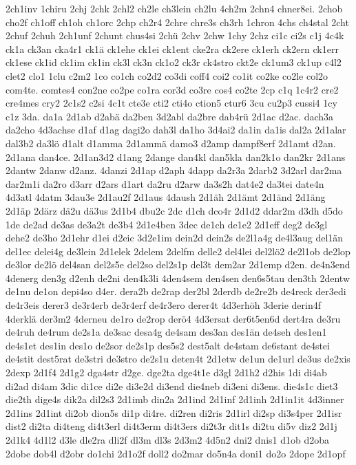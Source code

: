 {2ch1inv
1chiru
2chj
2chk
2chl2
ch2le
ch3lein
ch2lu
4ch2m
2chn4
chner8ei.
2chob
cho2f
ch1off
ch1oh
ch1orc
2chp
ch2r4
2chre
chre3s
ch3rh
1chron
4chs
ch4stal
2cht
2chuf
2chuh
2ch1unf
2chunt
chus4si
2chü
2chv
2chw
1chy
2chz
ci1c
ci2s
c1j
4c4k
ck1a
ck3an
cka4r1
ck1ä
ck1ehe
ck1ei
ck1ent
cke2ra
ck2ere
ck1erh
ck2ern
ck1err
ck1ese
ck1id
ck1im
ck1in
ck3l
ck3n
ck1o2
ck3r
ck4stro
ckt2e
ck1um3
ck1up
c4l2
clet2
clo1
1clu
c2m2
1co
co1ch
co2d2
co3di
coff4
coi2
co1it
co2ke
co2le
col2o
com4te.
comtes4
con2ne
co2pe
co1ra
cor3d
co3re
cos4
co2te
2cp
c1q
1c4r2
cre2
cre4mes
cry2
2c1s2
c2si
4c1t
cte3e
cti2
cti4o
ction5
ctur6
3cu
cu2p3
cussi4
1cy
c1z
3da.
da1a
2d1ab
d2abä
da2ben
3d2abl
da2bre
dab4rü
2d1ac
d2ac.
dach3a
da2cho
4d3achse
d1af
d1ag
dagi2o
dah3l
da1ho
3d4ai2
da1in
da1is
dal2a
2d1alar
dal3b2
da3lö
d1alt
d1amma
2d1ammä
damo3
d2amp
dampf8erf
2d1amt
d2an.
2d1ana
dan4ce.
2d1an3d2
d1ang
2dange
dan4kl
dan5kla
dan2k1o
dan2kr
2d1ans
2dantw
2danw
d2anz.
4danzi
2d1ap
d2aph
4dapp
da2r3a
2darb2
3d2arl
dar2ma
dar2m1i
da2ro
d3arr
d2ars
d1art
da2ru
d2arw
da3s2h
dat4e2
da3tei
date4n
4d3atl
4datm
3dau3e
2d1au2f
2d1aus
4daush
2d1äh
2d1ämt
2d1änd
2d1äng
2d1äp
2därz
dä2u
dä3us
2d1b4
dbu2c
2dc
d1ch
dco4r
2d1d2
ddar2m
d3dh
d5do
1de
de2ad
de3as
de3a2t
de3b4
2d1e4ben
3dec
de1ch
de1e2
2d1eff
deg2
de3gl
dehe2
de3ho
2d1ehr
d1ei
d2eic
3d2e1im
dein2d
dein2s
de2l1a4g
de4l3aug
del1än
del1ec
delei4g
de3lein
2d1elek
2delem
2delfm
delle2
del4lei
del2lö2
de2l1ob
de2lop
de3lor
de2lö
del4san
del2s5e
del2so
del2s1p
del3t
dem2ar
2d1emp
d2en.
de4n3end
4denerg
den3g
d2enh
de2ni
den4k3li
4den4sem
den4sen
den6s5tau
den3th
2dentw
de1nu
de1on
depi4so
d4er.
dera2b
de2rap
der2bl
2derdb
de2re2b
de4reck
der3edi
de4r3eis
derer3
de3r4erb
de3r4erf
de4r3ero
derer4t
4d3erhöh
3derie
derin4f
4derklä
der3m2
4derneu
de1ro
de2rop
derö4
4d3ersat
der6t5en6d
dert4ra
de3ru
de4ruh
de4rum
de2s1a
de3sac
desa4g
de4sam
des3an
des1än
de4seh
des1en1
de4s1et
des1in
des1o
de2sor
de2s1p
des5s2
dest5alt
de4stam
de6stant
de4stei
de4stit
dest5rat
de3stri
de3stro
de2s1u
deten4t
2d1etw
de1un
de1url
de3us
de2xis
2dexp
2d1f4
2d1g2
dga4str
d2ge.
dge2ta
dge4t1e
d3gl
2d1h2
d2his
1di
di4ab
di2ad
di4am
3dic
di1ce
di2e
di3e2d
di3end
die4neb
di3eni
di3ens.
die4s1c
diet3
die2th
dige4s
dik2a
dil2s3
2d1imb
din2a
2d1ind
2d1inf
2d1inh
2d1in1it
4d3inner
2d1ins
2d1int
di2ob
dion5s
di1p
di4re.
di2ren
di2ris
2d1irl
di2sp
di3s4per
2d1isr
dist2
di2ta
di4teng
di4t3erl
di4t3erm
di4t3ers
di2t3r
dit1s
di2tu
di5v
diz2
2d1j
2d1k4
4d1l2
d3le
dle2ra
dli2f
dl3m
dl3s
2d3m2
4d5n2
dni2
dnis1
d1ob
d2oba
2dobe
dob4l
d2obr
do1chi
2d1o2f
doll2
do2mar
do5n4a
doni1
do2o
2dope
2d1opf
}
